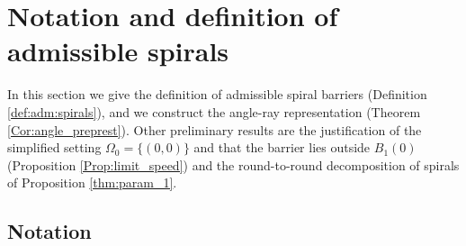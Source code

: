 \documentclass[reqno]{amsart}
\theoremstyle{definition} \newtheorem{definition}{Definition}[section]
\theoremstyle{definition} \newtheorem{remark}[definition]{Remark}
\theoremstyle{plain} \newtheorem{lemma}[definition]{Lemma}
\theoremstyle{plain} \newtheorem{proposition}[definition]{Proposition}
\theoremstyle{plain} \newtheorem{theorem}[definition]{Theorem}
\theoremstyle{plain} \newtheorem{corollary}[definition]{Corollary}
\theoremstyle{definition} \newtheorem{example}[definition]{Example}
\theoremstyle{plain} \newtheorem{claim}[clai]{Claim}
\theoremstyle{definition} \newtheorem{assumption}[definition]{Assumption}
\theoremstyle{definition} \newtheorem{observation}[definition]{Observation}
\newcommand{\1}{\mathbbm 1}
\numberwithin{equation}{section} %
\theoremstyle{plain} \newtheorem*{theorem*}{Theorem}
\theoremstyle{plain} \newtheorem{mthm}[maintheorem]{Main Theorem}
\theoremstyle{plain} \newtheorem*{mthm*}{Main Theorem}
\theoremstyle{plain} \newtheorem*{conjecture*}{Conjecture}
\theoremstyle{plain} \newtheorem{conjecture}[definition]{Conjecture}
\theoremstyle{plain} \newtheorem*{problem*}{Problem}
\begin{document}
\section{Notation and definition of admissible spirals}
\label{s:admissible:barriers}


In this section we give the definition of admissible spiral barriers (Definition \ref{def:adm:spirals}), and we construct the angle-ray representation (Theorem \ref{Cor:angle_preprest}). Other preliminary results are the justification of the simplified setting $\Omega_0 = \{(0,0)\}$ and that the barrier lies outside $B_1(0)$ (Proposition \ref{Prop:limit_speed}) and the round-to-round decomposition of spirals of Proposition \ref{thm:param_1}.


\subsection{Notation}
\label{Ss:notation_general}
\end{document}
